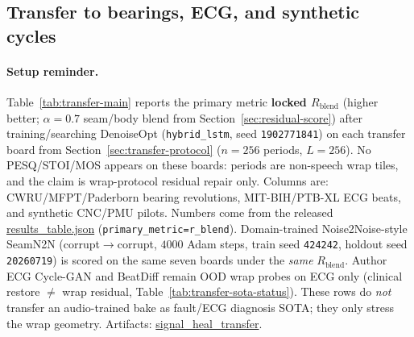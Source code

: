 \subsection{Transfer to bearings, ECG, and synthetic cycles}
\label{sec:transfer-main}

\paragraph{Setup reminder.}
Table~\ref{tab:transfer-main} reports the primary metric \textbf{locked $R_{\mathrm{blend}}$} (higher better; $\alpha{=}0.7$ seam/body blend from Section~\ref{sec:residual-score}) after training/searching DenoiseOpt
(\texttt{hybrid\_lstm}, seed \texttt{1902771841}) on each transfer board
from Section~\ref{sec:transfer-protocol} ($n{=}256$ periods, $L{=}256$).
No PESQ/STOI/MOS appears on these boards: periods are non-speech wrap tiles, and the claim is wrap-protocol residual repair only.
Columns are: CWRU/MFPT/Paderborn bearing revolutions, MIT-BIH/PTB-XL ECG beats, and synthetic CNC/PMU pilots.
Numbers come from the released
\href{https://github.com/reeldemo/reelsynth/blob/main/brand/artifacts/signal_heal_transfer/results_table.json}{results\_table.json}
(\texttt{primary\_metric=r\_blend}).
Domain-trained Noise2Noise-style SeamN2N (corrupt$\to$corrupt, $4000$ Adam steps, train seed \texttt{424242}, holdout seed \texttt{20260719})
is scored on the same seven boards under the \emph{same} $R_{\mathrm{blend}}$.
Author ECG Cycle-GAN and BeatDiff remain OOD wrap probes on ECG only
(clinical restore $\neq$ wrap residual, Table~\ref{tab:transfer-sota-status}).
These rows do \emph{not} transfer an audio-trained bake as fault/ECG diagnosis SOTA; they only stress the wrap geometry.
Artifacts:
\href{https://github.com/reeldemo/reelsynth/tree/main/brand/artifacts/signal_heal_transfer}{signal\_heal\_transfer}.

